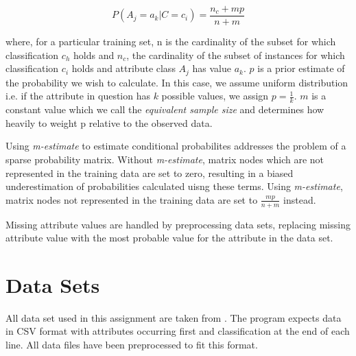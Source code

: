 \documentclass[10pt]{report}
\begin{document}
\begin{equation*}
P(A_{j}=a_{k}|C=c_{i}) = \frac{n_{c} + mp}{n + m}
\end{equation*}

where, for a particular training set, n is the cardinality of the
subset for which classification \(c_h\) holds and \(n_c\), the
cardinality of the subset of instances for which classification
\(c_i\) holds and attribute class \(A_j\) has value \(a_k\). \(p\) is
a prior estimate of the probability we wish to calculate. In this
case, we assume uniform distribution i.e. if the attribute in question
has \(k\) possible values, we assign \(p = \frac{1}{k}\). \(m\) is a
constant value which we call the \textit{equivalent sample size} and
determines how heavily to weight p relative to the observed
data. 

Using \textit{m-estimate} to estimate conditional probabilites
addresses the problem of a sparse probability matrix. Without
\textit{m-estimate}, matrix nodes which are not represented in the
training data are set to zero, resulting in a biased underestimation
of probabilities calculated uisng these terms. Using
\textit{m-estimate}, matrix nodes not represented in the training data
are set to \(\frac{mp}{n + m}\) instead.

Missing attribute values are handled by preprocessing data sets,
replacing missing attribute value with the most probable value for the
attribute in the data set.


\section{Data Sets}
All data set used in this assignment are taken from
\cite{Frank+Asuncion:2010}. The program expects data in CSV format
with attributes occurring first and classification at the end of each
line. All data files have been preprocessed to fit this format.
\end{document}
